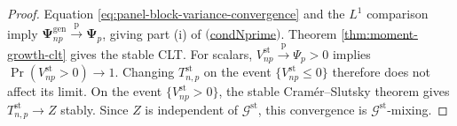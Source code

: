 \documentclass[10pt,a4paper]{amsart}
\newcommand{\G}{\mathcal{G}}
\newcommand\mat[1]{\mathbf{#1}}
\newcommand{\pconverge}{\overset{\mathrm{p}}{\to}}
\newcommand{\refitem}[1]{$\mathrm{(}$\hyperlink{cond:#1}{\csname cond#1\endcsname}$\mathrm{)}$}
\begin{document}
\begin{proof}
Equation \eqref{eq:panel-block-variance-convergence} and the \(L^1\) comparison imply \(\mat{\Psi}_{np}^{\mathrm{gen}}\pconverge\mat\Psi_p\), giving part (i) of \refitem{Nprime}.
Theorem \ref{thm:moment-growth-clt} gives the stable CLT.
For scalars, \(V_{np}^{\mathrm{st}}\pconverge\Psi_p>0\) implies \(\Pr(V_{np}^{\mathrm{st}}>0)\to1\).
Changing \(T_{n,p}^{\mathrm{st}}\) on the event \(\{V_{np}^{\mathrm{st}}\leq0\}\) therefore does not affect its limit.
On the event \(\{V_{np}^{\mathrm{st}}>0\}\), the stable Cram\'er--Slutsky theorem gives \(T_{n,p}^{\mathrm{st}}\to Z\) stably.
Since \(Z\) is independent of \(\G^{\mathrm{st}}\), this convergence is \(\G^{\mathrm{st}}\)-mixing.
\end{proof}
\end{document}
